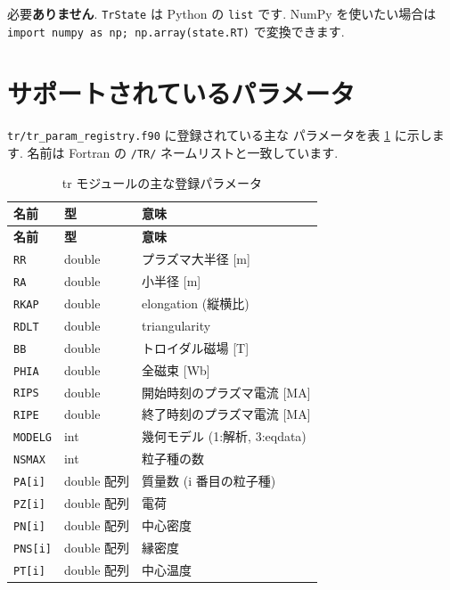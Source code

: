 \documentclass[11pt,a4paper]{report}
\begin{document}
\begin{faq}
必要\textbf{ありません}. \texttt{TrState} は Python の \texttt{list}
です. NumPy を使いたい場合は
\texttt{import numpy as np; np.array(state.RT)} で変換できます.
\end{faq}

\section{サポートされているパラメータ}

\texttt{tr/tr\_param\_registry.f90} に登録されている主な
パラメータを表 \ref{tbl:tr-params} に示します. 名前は Fortran の
\texttt{/TR/} ネームリストと一致しています.

\begin{longtable}{@{}p{3.3cm}p{2.2cm}p{9cm}@{}}
\caption{tr モジュールの主な登録パラメータ}\label{tbl:tr-params}\\
\toprule
\textbf{名前} & \textbf{型} & \textbf{意味} \\ \midrule
\endfirsthead
\toprule
\textbf{名前} & \textbf{型} & \textbf{意味} \\ \midrule
\endhead
\texttt{RR}      & double       & プラズマ大半径 [m] \\
\texttt{RA}      & double       & 小半径 [m] \\
\texttt{RKAP}    & double       & elongation (縦横比) \\
\texttt{RDLT}    & double       & triangularity \\
\texttt{BB}      & double       & トロイダル磁場 [T] \\
\texttt{PHIA}    & double       & 全磁束 [Wb] \\
\texttt{RIPS}    & double       & 開始時刻のプラズマ電流 [MA] \\
\texttt{RIPE}    & double       & 終了時刻のプラズマ電流 [MA] \\
\texttt{MODELG}  & int          & 幾何モデル (1:解析, 3:eqdata) \\
\texttt{NSMAX}   & int          & 粒子種の数 \\
\texttt{PA[i]}   & double 配列  & 質量数 (i 番目の粒子種) \\
\texttt{PZ[i]}   & double 配列  & 電荷 \\
\texttt{PN[i]}   & double 配列  & 中心密度 \\
\texttt{PNS[i]}  & double 配列  & 縁密度 \\
\texttt{PT[i]}   & double 配列  & 中心温度 \\

\end{longtable}
\end{document}
